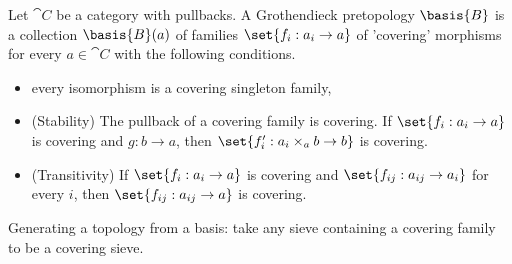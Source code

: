 \begin{definition}[Basis]
Let $\cat{C}$ be a category with pullbacks.
A Grothendieck pretopology $\basis{B}$ is a collection $\basis{B}(a)$ 
of families $\set{f_i:a_i\rightarrow a}$ of 'covering' morphisms 
for every $a\in \cat{C}$ with the following conditions.

\begin{itemize}
	\item  every isomorphism is a covering singleton family,
	\item (Stability) The pullback of a covering family is covering. 
		If  $\set{f_i:a_i\rightarrow a}$ is covering and $g:b\rightarrow a$, then $\set{f'_i:a_i\times_a b\rightarrow b}$ is covering.
	\item (Transitivity) If $\set{f_i:a_i\rightarrow a}$ is covering 
		and $\set{ f_{ij}: a_{ij} \rightarrow a_i}$ for every $i$, 
		then $\set{f_{ij}:a_{ij}\rightarrow a}$ is covering.
\end{itemize}

Generating a topology from a basis: take any sieve containing a covering family to be a covering sieve.
\end{definition}